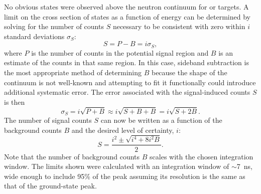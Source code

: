 No obvious \zp states were observed above the neutron continuum for  or  targets.  A limit on the cross section of \zp states as a function of energy can be determined by solving for the number of counts $S$ necessary to be consistent with zero within $i$ standard deviations $\sigma_S$:
\begin{equation}
S = P - B = i\sigma_S,
\end{equation}
where $P$ is the number of counts in the potential signal region and $B$ is an estimate of the counts in that same region.  In this case, sideband subtraction is the most appropriate method of determining $B$ because the shape of the continuum is not well-known and attempting to fit it functionally could introduce additional systematic error.  The error associated with the signal-induced counts $S$ is then
\begin{equation}
\sigma_S = i\sqrt{P+B} \approx i\sqrt{S+B+B} = i\sqrt{S+2B}.
\end{equation}
The number of signal counts $S$ can now be written as a function of the background counts $B$ and the desired level of certainty, $i$:
\begin{equation}
S = \frac{i^2 \pm \sqrt{i^4 + 8i^2B}}{2}.
\end{equation}
Note that the number of background counts $B$ scales with the chosen integration window.  The limits shown were calculated with an integration window of $\sim$7~ns, wide enough to include 95\% of the peak assuming its resolution is the same as that of the ground-state peak.


